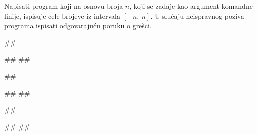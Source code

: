  
\begin{Exercise}[label=p2.6_04] 
 Napisati program koji na osnovu broja $n$, koji se zadaje kao argument komandne 
 linije, ispisuje cele brojeve iz intervala $[-n,\ n]$.
 U slučaju neispravnog poziva programa ispisati odgovarajuću poruku o grešci.
 
\begin{minitest}
\begin{upotreba}{1}
##

#\naslovIzlaz#
##
\end{upotreba}
\end{minitest}
\begin{minitest}
\begin{upotreba}{2}
##

#\naslovIzlaz#
##
\end{upotreba}
\end{minitest}
\begin{minitest}
\begin{upotreba}{3}
##

#\naslovIzlaz#
##
\end{upotreba}
\end{minitest}

\end{Exercise}
\ifresenja
\begin{Answer}[ref=p2.6_04]
\end{Answer}
 \fi 
 

